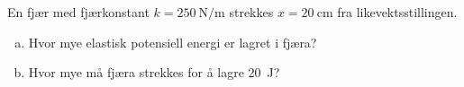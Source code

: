 %
En fjær med fjærkonstant $k = \SI{250}{\newton\per\metre}$ strekkes $x = \SI{20}{\centi\metre}$ fra likevektsstillingen.
\begin{enumerate}[a)]
    \item Hvor mye elastisk potensiell energi er lagret i fjæra?
    \item Hvor mye må fjæra strekkes for å lagre \SI{20}{\joule}?
\end{enumerate}
